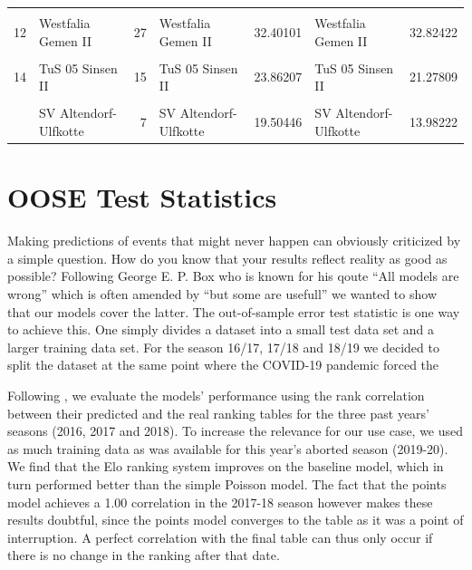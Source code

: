 \documentclass[12pt,a4paper]{article}
\begin{document}
\begin{table}[H]
{\begin{tabular}[t]{rlrlrlr}
\addlinespace
\cellcolor{gray!6}{11} & \cellcolor{gray!6}{FC RW Dorsten} & \cellcolor{gray!6}{28} & \cellcolor{gray!6}{FC RW Dorsten} & \cellcolor{gray!6}{35.82449} & \cellcolor{gray!6}{FC RW Dorsten} & \cellcolor{gray!6}{37.59242}\\
12 & Westfalia Gemen II & 27 & Westfalia Gemen II & 32.40101 & Westfalia Gemen II & 32.82422\\
\cellcolor{gray!6}{13} & \cellcolor{gray!6}{SC Reken II} & \cellcolor{gray!6}{25} & \cellcolor{gray!6}{SC Reken II} & \cellcolor{gray!6}{29.11275} & \cellcolor{gray!6}{SC Reken II} & \cellcolor{gray!6}{27.60483}\\
14 & TuS 05 Sinsen II & 15 & TuS 05 Sinsen II & 23.86207 & TuS 05 Sinsen II & 21.27809\\
\cellcolor{gray!6}{15} & \cellcolor{gray!6}{Adler Weseke II} & \cellcolor{gray!6}{15} & \cellcolor{gray!6}{Adler Weseke II} & \cellcolor{gray!6}{22.59512} & \cellcolor{gray!6}{Adler Weseke II} & \cellcolor{gray!6}{18.88125}\\
\addlinespace
16 & SV Altendorf-Ulfkotte & 7 & SV Altendorf-Ulfkotte & 19.50446 & SV Altendorf-Ulfkotte & 13.98222\\
\bottomrule
\end{tabular}}
\end{table}

\hypertarget{oose-test-statistics}{%
\section{OOSE Test Statistics}\label{oose-test-statistics}}

Making predictions of events that might never happen can obviously
criticized by a simple question. How do you know that your results
reflect reality as good as possible? Following George E. P. Box who is
known for his qoute \enquote{All models are wrong} which is often
amended by \enquote{but some are usefull} we wanted to show that our
models cover the latter. The out-of-sample error test statistic is one
way to achieve this. One simply divides a dataset into a small test data
set and a larger training data set. For the season 16/17, 17/18 and
18/19 we decided to split the dataset at the same point where the
COVID-19 pandemic forced the

Following \textcite{leitner2010}, we evaluate the models' performance
using the rank correlation between their predicted and the real ranking
tables for the three past years' seasons (2016, 2017 and 2018). To
increase the relevance for our use case, we used as much training data
as was available for this year's aborted season (2019-20). We find that
the Elo ranking system improves on the baseline model, which in turn
performed better than the simple Poisson model. The fact that the points
model achieves a 1.00 correlation in the 2017-18 season however makes
these results doubtful, since the points model converges to the table as
it was a point of interruption. A perfect correlation with the final
table can thus only occur if there is no change in the ranking after
that date.
\end{document}
